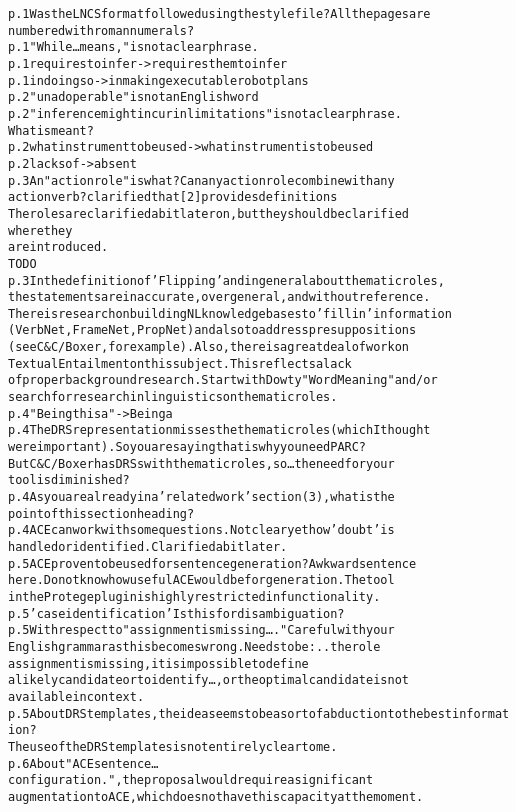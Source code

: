 \documentclass[oribibl]{llncs}
\newcommand{\comment}[1]{{\color{red} #1}}
\newcommand{\tick}{{\color{red}\ding{52}}}
\begin{document}
\begin{alltt}
p. 1 Was the LNCS format followed using the style file?  All the pages are 
numbered with roman numerals? \tick
p. 1 "While…means," is not a clear phrase.
p. 1 requires to infer -> requires them to infer \tick
p. 1 in doing so -> in making executable robot plans
p. 2 "unadoperable" is not an English word \tick
p. 2  "inference might incur in limitations" is not a clear phrase. 
 What is meant?
p. 2  what instrument to be used -> what instrument is to be used \tick
p. 2 lacks of -> absent \tick
p. 3 An "action role" is what?  Can any action role combine with any 
action verb? \tick \comment{clarified that [2] provides definitions} 
The roles are clarified a bit later on, but they should be clarified 
where they 
are introduced.
\comment{TODO}
p. 3 In the definition of 'Flipping' and in general about thematic roles,
 the statements are inaccurate, overgeneral, and without reference.  
 There is research on building NL knowledge bases to 'fill in' information
  (VerbNet, FrameNet, PropNet) and also to address presuppositions 
  (see C&C/Boxer, for example).  Also, there is a great deal of work on 
  Textual Entailment on this subject.  This reflects a lack 
 of proper background research.  Start with Dowty "Word Meaning" and/or 
 search for research in linguistics on thematic roles.
p. 4 "Being this a" -> Being a \tick
p. 4 The DRS representation misses the thematic roles (which I thought 
were important). So you are saying that is why you need PARC?  
But C&C/Boxer has DRSs with thematic roles, so…the need for your 
tool is diminished?
p. 4 As you are already in a 'related work' section (3), what is the 
point of this section heading? \tick
p. 4 ACE can work with some questions.  Not clear yet how 'doubt' is
 handled or identified. Clarified a bit later. 
p. 5 ACE proven to be used for sentence generation?  Awkward sentence
 here.  Do not know how useful ACE would be for generation.  The tool 
 in the Protege plug in is highly restricted in functionality. \tick
p. 5 'case identification' Is this for disambiguation?
p. 5 With respect to "assignment is missing…."  Careful with your
 English grammar as this becomes wrong.  Needs to be: ..the role 
 assignment is missing, it is impossible to define 
a likely candidate or to identify…, or the optimal candidate is not
 available in context.
p. 5 About DRS templates, the idea seems to be a sort of abduction to the best information?
  The use of the DRS templates is not entirely clear to me. 
p. 6 About "ACE sentence…configuration.", the proposal would require a significant 
augmentation to ACE, which does not have this capacity at the moment.

\end{alltt}
\end{document}
